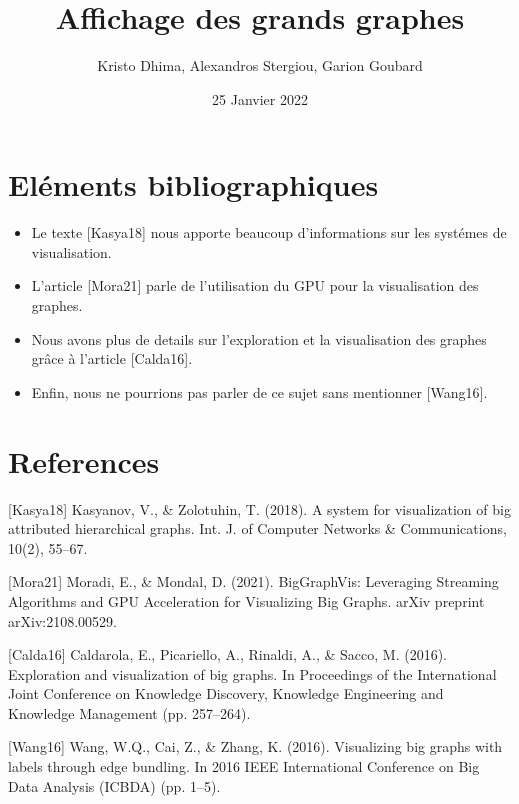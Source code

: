 \documentclass{article}
\title{Affichage des grands graphes}
\author{Kristo Dhima, Alexandros Stergiou, Garion Goubard }
\date{25 Janvier 2022}
\begin{document}
\maketitle
\section{Eléments bibliographiques}
\begin{itemize}
    \item Le texte [Kasya18] nous apporte beaucoup d'informations sur les systémes de visualisation.
    \item L'article [Mora21] parle de l'utilisation du GPU pour la visualisation des graphes.
    \item Nous avons plus de details sur l'exploration et la visualisation des graphes grâce à l'article [Calda16].
    \item Enfin, nous ne pourrions pas parler de ce sujet sans mentionner [Wang16].
\end{itemize}
\section{References} 

[Kasya18] Kasyanov, V., \& Zolotuhin, T. (2018). A system for visualization of big attributed hierarchical graphs. Int. J. of Computer Networks \& Communications, 10(2), 55–67. 

[Mora21] Moradi, E., \& Mondal, D. (2021). BigGraphVis: Leveraging Streaming Algorithms and GPU Acceleration for Visualizing Big Graphs. arXiv preprint arXiv:2108.00529.

[Calda16] Caldarola, E., Picariello, A., Rinaldi, A., \& Sacco, M. (2016). Exploration and visualization of big graphs. In Proceedings of the International Joint Conference on Knowledge Discovery, Knowledge Engineering and Knowledge Management (pp. 257–264).

[Wang16]  Wang, W.Q., Cai, Z., \& Zhang, K. (2016). Visualizing big graphs with labels through edge bundling. In 2016 IEEE International Conference on Big Data Analysis (ICBDA) (pp. 1–5).
\end{document}
